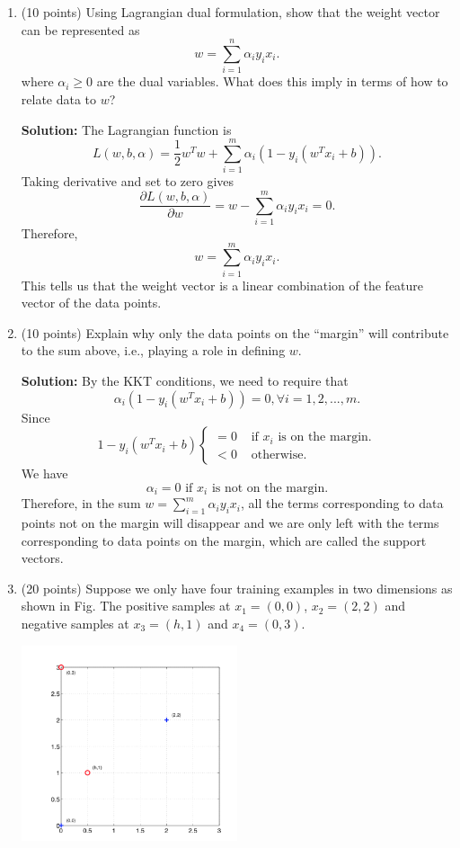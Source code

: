 \documentclass[twoside,10pt]{article}
\begin{document}
\begin{enumerate}
\begin{enumerate}
\item (10 points) Using Lagrangian dual formulation, show that the weight vector can be represented as
\[
w = \sum_{i=1}^n \alpha_i y_i x_i.
\]
where $\alpha_i \geq 0$ are the dual variables. What does this imply in terms of how to relate data to $w$?
\begin{tcolorbox}
\textbf{Solution:} The Lagrangian function is $$L(w,b,\alpha) = \frac 1 2 w^T w + \sum_{i=1}^m \alpha_i (1- y_i (w^Tx_i + b)).$$ Taking derivative and set to zero gives $$\frac{\partial L(w,b,\alpha)}{\partial w} = w - \sum_{i=1}^m \alpha_iy_i x_i = 0. $$ Therefore, $$w = \sum_{i=1}^m \alpha_iy_i x_i.$$ This tells us that the weight vector is a linear combination of the feature vector of the data points.
\end{tcolorbox}

\item (10 points) Explain why only the data points on the ``margin'' will contribute to the sum above, i.e., playing a role in defining $w$. 
\begin{tcolorbox}
\textbf{Solution:} By the KKT conditions, we need to require that $$\alpha_i (1- y_i (w^Tx_i + b)) = 0, \forall i = 1, 2, ..., m.$$ Since $$1- y_i (w^Tx_i + b) \left\{ \begin{array}{lcr} = 0 & \mbox{ if } x_i \mbox{ is on the margin.} \\
< 0 &\mbox{ otherwise.} \end{array} \right.$$ We have $$\alpha_i  = 0  \mbox{ if } x_i \mbox{ is not on the margin.} $$ Therefore, in the sum $w = \sum_{i=1}^m \alpha_iy_i x_i$, all the terms corresponding to data points not on the margin will disappear and we are only left with the terms corresponding to data points on the margin, which are called the support vectors. 
\end{tcolorbox}

\item (20 points) Suppose we only have four training examples in two dimensions as shown in Fig. The positive samples at $x_1 = (0, 0)$, $x_2 = (2, 2)$ and negative samples at $x_3 = (h, 1)$ and $x_4 = (0, 3)$. 
%
\begin{center}
\includegraphics[width = 0.5\textwidth]{images/svm}
\end{center}


\end{enumerate}
\end{enumerate}
\end{document}

